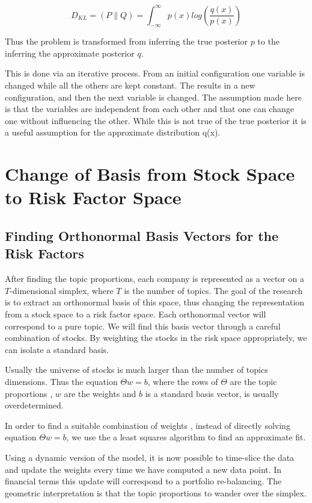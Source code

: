 \documentclass[12pt,journal,letterpaper,oneside,onecolumn]{IEEEtran}
\begin{document}
\begin{equation}
D_{KL} = (P \parallel Q) = \int_{- \infty}^{\infty} p(x) log \left( \frac{q (x)}{p(x)} \right)
\end{equation}

Thus the problem is transformed from inferring the true posterior $p$ to the inferring the approximate posterior $q$.

This is done via an iterative process.
From an initial configuration one variable is changed while all the others are kept constant. The results in a new configuration, and then the next variable is changed. 
The assumption made here is that the variables are independent from each other and that one can change one without influencing the other. While this is not true of the true posterior it is a useful assumption for the approximate distribution q(x).


\section{Change of Basis from Stock Space to Risk Factor Space }

\subsection{Finding Orthonormal Basis Vectors for the Risk Factors}

After finding the topic proportions, each company is represented as a vector on a $T$-dimensional simplex, where $T$ is the number of topics.
The goal of the research is to extract an orthonormal basis of this space, thus changing the representation from a stock space to a risk factor space.
Each orthonormal vector will correspond to a pure topic.
We will find this basis vector through a careful combination of stocks. By weighting the stocks in the risk space appropriately, we can isolate a standard basis.

Usually the universe of stocks is much larger than the number of topics dimensions. Thus the equation $\Theta w = b$, where the rows of $\Theta$ are the topic proportions  , $w$ are the weights and $b$ is a standard basis vector, is usually overdetermined.

In order to find a suitable combination of weights , instead of directly solving equation $\Theta w = b$, we use the a least squares algorithm to find an approximate fit.

Using a dynamic version of the model, it is now possible to time-slice the data and update the weights every time we have computed a new data point. In financial terms this update will correspond to a portfolio re-balancing.
The geometric interpretation is that the topic proportions to wander over the simplex.
\end{document}
